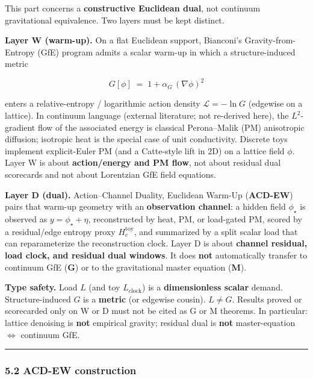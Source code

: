 \documentclass[
  11pt,
]{article}
\begin{document}
This part concerns a \textbf{constructive Euclidean dual}, not continuum gravitational equivalence. Two layers must be kept distinct.

\textbf{Layer W (warm-up).} On a flat Euclidean support, Bianconi's Gravity-from-Entropy (GfE) program admits a scalar warm-up in which a structure-induced metric

\[
G[\phi] \;=\; 1 + \alpha_G\,(\nabla\phi)^2
\]

enters a relative-entropy / logarithmic action density \(\mathcal{L}=-\ln G\) (edgewise on a lattice). In continuum language (external literature; not re-derived here), the \(L^2\)-gradient flow of the associated energy is classical Perona--Malik (PM) anisotropic diffusion; isotropic heat is the special case of unit conductivity. Discrete toys implement explicit-Euler PM (and a Catte-style lift in 2D) on a lattice field \(\phi\). Layer W is about \textbf{action/energy and PM flow}, not about residual dual scorecards and not about Lorentzian GfE field equations.

\textbf{Layer D (dual).} Action--Channel Duality, Euclidean Warm-Up (\textbf{ACD-EW}) pairs that warm-up geometry with an \textbf{observation channel}: a hidden field \(\phi_\star\) is observed as \(y=\phi_\star+\eta\), reconstructed by heat, PM, or load-gated PM, scored by a residual/edge entropy proxy \(H_c^{\mathrm{toy}}\), and summarized by a split scalar load that can reparameterize the reconstruction clock. Layer D is about \textbf{channel residual, load clock, and residual dual windows}. It does \textbf{not} automatically transfer to continuum GfE (\textbf{G}) or to the gravitational master equation (\textbf{M}).

\textbf{Type safety.} Load \(L\) (and toy \(L_{\mathrm{clock}}\)) is a \textbf{dimensionless scalar} demand. Structure-induced \(G\) is a \textbf{metric} (or edgewise cousin). \textbf{\(L\neq G\)}. Results proved or scorecarded only on W or D must not be cited as G or M theorems. In particular: lattice denoising is \textbf{not} empirical gravity; residual dual is \textbf{not} master-equation \(\Leftrightarrow\) continuum GfE.

\begin{center}\rule{0.5\linewidth}{0.5pt}\end{center}

\subsubsection{5.2 ACD-EW construction}\label{acd-ew-construction}
\end{document}
